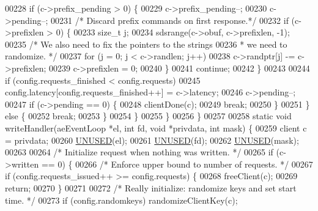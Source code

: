 \begin{DoxyCode}
{{{00228                 \textcolor{keywordflow}{if} (c->prefix\_pending > 0) \{
00229                     c->prefix\_pending--;
00230                     c->pending--;
00231                     \textcolor{comment}{/* Discard prefix commands on first response.*/}
00232                     \textcolor{keywordflow}{if} (c->prefixlen > 0) \{
00233                         size\_t j;
00234                         sdsrange(c->obuf, c->prefixlen, -1);
00235                         \textcolor{comment}{/* We also need to fix the pointers to the strings}
00236 \textcolor{comment}{                        * we need to randomize. */}
00237                         \textcolor{keywordflow}{for} (j = 0; j < c->randlen; j++)
00238                             c->randptr[j] -= c->prefixlen;
00239                         c->prefixlen = 0;
00240                     \}
00241                     \textcolor{keywordflow}{continue};
00242                 \}
00243 
00244                 \textcolor{keywordflow}{if} (config.requests\_finished < config.requests)
00245                     config.latency[config.requests\_finished++] = c->latency;
00246                 c->pending--;
00247                 \textcolor{keywordflow}{if} (c->pending == 0) \{
00248                     clientDone(c);
00249                     \textcolor{keywordflow}{break};
00250                 \}
00251             \} \textcolor{keywordflow}{else} \{
00252                 \textcolor{keywordflow}{break};
00253             \}
00254         \}
00255     \}
00256 \}
00257 
00258 \textcolor{keyword}{static} \textcolor{keywordtype}{void} writeHandler(aeEventLoop *el, \textcolor{keywordtype}{int} fd, \textcolor{keywordtype}{void} *privdata, \textcolor{keywordtype}{int} mask) \{
00259     client c = privdata;
00260     \hyperlink{server_8h_ae7c9dc8f13568a9c856573751f1ee1ec}{UNUSED}(el);
00261     \hyperlink{server_8h_ae7c9dc8f13568a9c856573751f1ee1ec}{UNUSED}(fd);
00262     \hyperlink{server_8h_ae7c9dc8f13568a9c856573751f1ee1ec}{UNUSED}(mask);
00263 
00264     \textcolor{comment}{/* Initialize request when nothing was written. */}
00265     \textcolor{keywordflow}{if} (c->written == 0) \{
00266         \textcolor{comment}{/* Enforce upper bound to number of requests. */}
00267         \textcolor{keywordflow}{if} (config.requests\_issued++ >= config.requests) \{
00268             freeClient(c);
00269             \textcolor{keywordflow}{return};
00270         \}
00271 
00272         \textcolor{comment}{/* Really initialize: randomize keys and set start time. */}
00273         \textcolor{keywordflow}{if} (config.randomkeys) randomizeClientKey(c);
}}}
\end{DoxyCode}
